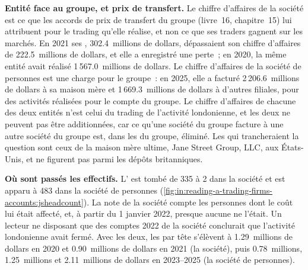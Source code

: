\textbf{Entité face au groupe, et prix de transfert.} Le chiffre d'affaires de la société est ce que les accords de prix de transfert du groupe
(livre~16, chapitre~15) lui attribuent pour le trading qu'elle réalise, et non ce que ses traders gagnent sur les marchés. En 2021
ses , 302.4~millions de dollars, dépassaient son chiffre d'affaires de 222.5~millions de dollars, et elle a enregistré une perte~; en 2020, la même entité
avait réalisé 1\,567.0~millions de dollars. Le chiffre d'affaires de la société de personnes est une charge pour le groupe~: en 2025, elle a facturé 2\,206.6~millions de dollars à
sa maison mère et 1\,669.3~millions de dollars à d'autres filiales, pour des activités réalisées pour le compte du groupe. Le chiffre d'affaires de chacune des deux entités
n'est celui du trading de l'activité londonienne, et les deux ne peuvent pas être additionnées, car ce qu'une société du groupe facture à une autre
société du groupe est, dans les  du groupe, éliminé. Les  qui trancheraient la question
sont ceux de la maison mère ultime, Jane Street Group, LLC, aux États-Unis, et ne figurent pas parmi les dépôts britanniques.

\textbf{Où sont passés les effectifs.} L' est tombé de 335 à 2 dans la société et est apparu à 483 dans la
société de personnes (\cref{fig:in:reading-a-trading-firms-accounts:jsheadcount}). La note de la société compte les
personnes dont le coût lui était affecté, et, à partir du 1 janvier 2022, presque aucune ne l'était. Un lecteur ne disposant que des
comptes 2022 de la société conclurait que l'activité londonienne avait fermé. Avec les deux, les  par tête s'élèvent à 1.29~millions de dollars en
2020 et 0.90~millions de dollars en 2021 (la société), puis 0.78~millions, 1.25~millions et 2.11~millions de dollars en 2023--2025 (la
société de personnes).

